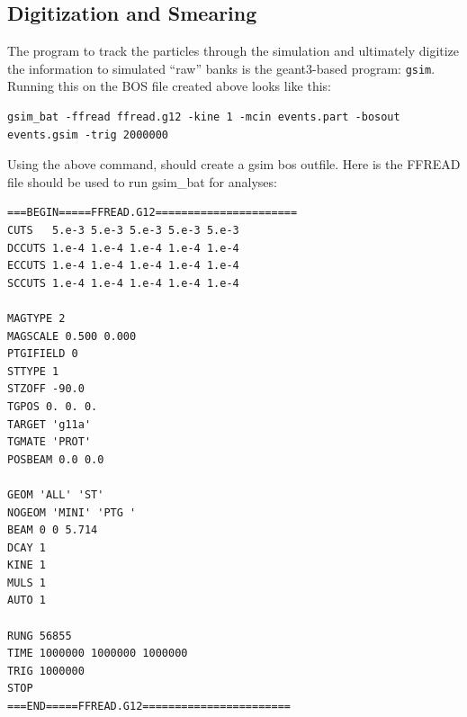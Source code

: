\subsection{\label{sec:sim.digit}Digitization and Smearing}

The program to track the particles through the simulation and ultimately digitize the information to simulated ``raw'' banks is the geant3-based program: \texttt{gsim}. Running this on the BOS file created above looks like this:
\begin{verbatim}
gsim_bat -ffread ffread.g12 -kine 1 -mcin events.part -bosout events.gsim -trig 2000000
\end{verbatim}
Using the above command, should create a gsim bos outfile. Here is the FFREAD file should be used to run gsim\_bat for  analyses:
\begin{verbatim}
===BEGIN=====FFREAD.G12======================
CUTS   5.e-3 5.e-3 5.e-3 5.e-3 5.e-3
DCCUTS 1.e-4 1.e-4 1.e-4 1.e-4 1.e-4
ECCUTS 1.e-4 1.e-4 1.e-4 1.e-4 1.e-4
SCCUTS 1.e-4 1.e-4 1.e-4 1.e-4 1.e-4

MAGTYPE 2
MAGSCALE 0.500 0.000
PTGIFIELD 0
STTYPE 1
STZOFF -90.0
TGPOS 0. 0. 0.
TARGET 'g11a'
TGMATE 'PROT'
POSBEAM 0.0 0.0

GEOM 'ALL' 'ST'
NOGEOM 'MINI' 'PTG '
BEAM 0 0 5.714
DCAY 1
KINE 1
MULS 1
AUTO 1

RUNG 56855
TIME 1000000 1000000 1000000
TRIG 1000000
STOP
===END=====FFREAD.G12=======================
\end{verbatim}

